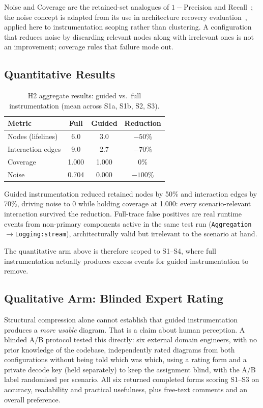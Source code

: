 Noise and Coverage are the retained-set analogues of $1-\text{Precision}$
and Recall~\cite{manning:ir}; the noise concept is adapted from its use
in architecture recovery evaluation~\cite{constantinou:noise}, applied
here to instrumentation scoping rather than clustering. A configuration
that reduces noise by discarding relevant nodes along with irrelevant
ones is not an improvement; coverage rules that failure mode out.

\subsection{Quantitative Results}\label{sec:h2-results}

\begin{table}[htb]
\centering
\caption{H2 aggregate results: guided vs.\ full instrumentation (mean across
  S1a, S1b, S2, S3).}
\label{tab:h2-results}
\begin{tabular}{@{} l c c c @{}}
\toprule
\textbf{Metric} & \textbf{Full} & \textbf{Guided} & \textbf{Reduction} \\
\midrule
Nodes (lifelines)     & 6.0 & 3.0 & $-50\%$ \\
Interaction edges     & 9.0 & 2.7 & $-70\%$ \\
Coverage              & 1.000 & 1.000 & $0\%$ \\
Noise                 & 0.704 & 0.000 & $-100\%$ \\
\bottomrule
\end{tabular}
\end{table}

Guided instrumentation reduced retained nodes by 50\% and interaction
edges by 70\%, driving noise to 0 while holding coverage at 1.000: every
scenario-relevant interaction survived the reduction. Full-trace false
positives are real runtime events from non-primary components active in
the same test run (\eg \texttt{Aggregation$\to$Logging:stream}),
architecturally valid but irrelevant to the scenario at hand.

The quantitative arm above is therefore scoped
to S1--S4, where full instrumentation actually produces excess events
for guided instrumentation to remove.

\subsection{Qualitative Arm: Blinded Expert Rating}\label{sec:h2-qual}

Structural compression alone cannot establish that guided instrumentation
produces a \emph{more usable} diagram. That is a claim about human
perception. A blinded A/B protocol tested this directly: six external
domain engineers, with no prior knowledge of the codebase, independently
rated diagrams from both configurations without being told which was
which, using a rating form and a private decode key (held separately) to
keep the assignment blind, with the A/B label randomised per scenario.
All six returned completed forms scoring S1--S3 on accuracy, readability
and practical usefulness, plus free-text comments and an overall
preference.

